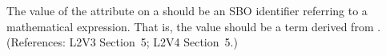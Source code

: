 The value of the  attribute on a \Trigger should be an SBO
identifier referring to a mathematical expression.  That is, the value
should be a term derived from \sbomathformula.  (References: 
L2V3 Section~5; L2V4 Section~5.)
